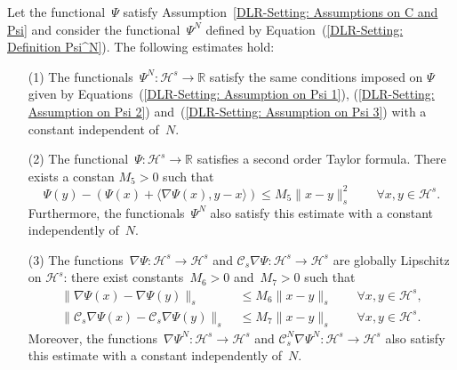 \begin{lemma}\autocite[Lemma 2.4]{Pillai2012}
\label{DLR-Seeting: Lemma: Properties of Psi and Psi^N}
 Let the functional~$\Psi$ satisfy Assumption~\ref{DLR-Setting: Assumptions on C and Psi} and consider the functional~$\Psi^N$ defined by Equation~(\ref{DLR-Setting: Definition Psi^N}). The following estimates hold:
 \begin{enumerate}
  \item[(1)] The functionals~$\Psi^N : \mathcal{H}^s \to \mathbb{R}$ satisfy the same conditions imposed on $\Psi$ given by Equations~(\ref{DLR-Setting: Assumption on Psi 1}), (\ref{DLR-Setting: Assumption on Psi 2}) and~(\ref{DLR-Setting: Assumption on Psi 3}) with a constant independent of~$N$.
  \item[(2)]  The functional~$\Psi: \mathcal{H}^s \to \mathbb{R}$ satisfies a second order Taylor formula. There exists a constan $M_5 >0$ such that
  \begin{equation}
  \label{DLR-Setting: Psi Taylor formula}
   \Psi(y) - \left( \Psi(x) + \langle \nabla \Psi(x), y-x \rangle \right) \leq M_5 \|x-y\|_s^2 \qquad \forall x,y \in \mathcal{H}^s. 
  \end{equation}
  Furthermore, the functionals~$\Psi^N$ also satisfy this estimate with a constant independently of~$N$.
  \item[(3)] The functions~$\nabla \Psi: \mathcal{H}^s \to \mathcal{H}^s$ and $\mathcal{C}_s\nabla \Psi: \mathcal{H}^s \to \mathcal{H}^s$ are globally Lipschitz on $\mathcal{H}^s$: there exist  constants~$M_6>0$ and~$M_7 > 0$ such that
  \begin{equation*}
    \begin{split}
      \|\nabla \Psi (x) - \nabla \Psi (y) \|_s & \; \leq M_6 \|x - y \|_s \qquad \forall x,y \in \mathcal{H}^s, \\
       \| \mathcal{C}_s\nabla \Psi (x) - \mathcal{C}_s\nabla \Psi (y) \|_s & \; \leq M_7 \|x - y \|_s \qquad \forall x,y \in \mathcal{H}^s.
    \end{split}
  \end{equation*}
  Moreover, the functions~$\nabla \Psi^N: \mathcal{H}^s \to \mathcal{H}^s$ and $\mathcal{C}_s^N\nabla \Psi^N: \mathcal{H}^s \to \mathcal{H}^s$ also satisfy this estimate with a constant independently of~$N$.
 \end{enumerate}

\end{lemma}

